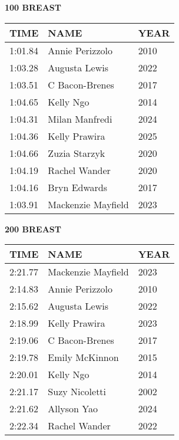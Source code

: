 \begin{table}[H]
\centering
\begin{minipage}[t]{0.48\textwidth}
\centering
\textbf{100 BREAST}\\[0.1cm]
\begin{tabular}{@{}p{1.8cm}p{2.8cm}p{1.2cm}@{}}
\hline
    \textbf{TIME} & \textbf{NAME} & \textbf{YEAR} \\
\hline
    1:01.84 & Annie Perizzolo & 2010 \\
    1:03.28 & Augusta Lewis & 2022 \\
    1:03.51 & C Bacon-Brenes & 2017 \\
    1:04.65 & Kelly Ngo & 2014 \\
    1:04.31 & Milan Manfredi & 2024 \\
    1:04.36 & Kelly Prawira & 2025 \\
    1:04.66 & Zuzia Starzyk & 2020 \\
    1:04.19 & Rachel Wander & 2020 \\
    1:04.16 & Bryn Edwards & 2017 \\
    1:03.91 & Mackenzie Mayfield & 2023 \\
\hline
\end{tabular}
\end{minipage}\hfill
\begin{minipage}[t]{0.48\textwidth}
\centering
\textbf{200 BREAST}\\[0.1cm]
\begin{tabular}{@{}p{1.8cm}p{2.8cm}p{1.2cm}@{}}
\hline
    \textbf{TIME} & \textbf{NAME} & \textbf{YEAR} \\
\hline
    2:21.77 & Mackenzie Mayfield & 2023 \\
    2:14.83 & Annie Perizzolo & 2010 \\
    2:15.62 & Augusta Lewis & 2022 \\
    2:18.99 & Kelly Prawira & 2023 \\
    2:19.06 & C Bacon-Brenes & 2017 \\
    2:19.78 & Emily McKinnon & 2015 \\
    2:20.01 & Kelly Ngo & 2014 \\
    2:21.17 & Suzy Nicoletti & 2002 \\
    2:21.62 & Allyson Yao & 2024 \\
    2:22.34 & Rachel Wander & 2022 \\
\hline
\end{tabular}
\end{minipage}
\end{table}

